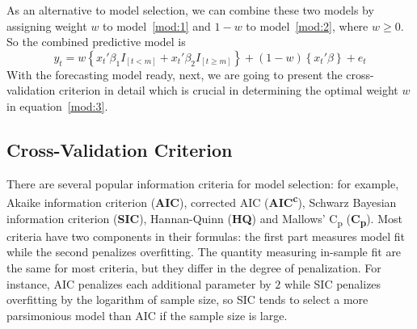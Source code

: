 As an alternative to model selection, we can combine these two models by assigning weight $w$ to model~\ref{mod:1} and $1 - w$ to model~\ref{mod:2}, where $w \geq 0$. So the combined predictive model is
\begin{equation} \label{mod:3}
    y_{t} = w \left\{ x_t'\beta_1 I_{[t<m]} + x_t'\beta_2 I_{[t \geq m]} \right\} + (1 - w) \left\{ x_t'\beta \right\} + e_t
\end{equation}
With the forecasting model ready, next, we are going to present the cross-validation criterion in detail which is crucial in determining the optimal weight $w$ in equation~\ref{mod:3}.
\subsection{Cross-Validation Criterion}
There are several popular information criteria for model selection: for example, Akaike information criterion (\textbf{AIC}), corrected AIC (\textbf{AIC\textsuperscript{c}}), Schwarz Bayesian information criterion (\textbf{SIC}), Hannan-Quinn (\textbf{HQ}) and Mallows' C\textsubscript{p} (\textbf{C\textsubscript{p}}). Most criteria have two components in their formulas: the first part measures model fit while the second penalizes overfitting. The quantity measuring in-sample fit are the same for most criteria, but they differ in the degree of penalization. For instance, AIC penalizes each additional parameter by $2$ while SIC penalizes overfitting by the logarithm of sample size, so SIC tends to select a more parsimonious model than AIC if the sample size is large.

